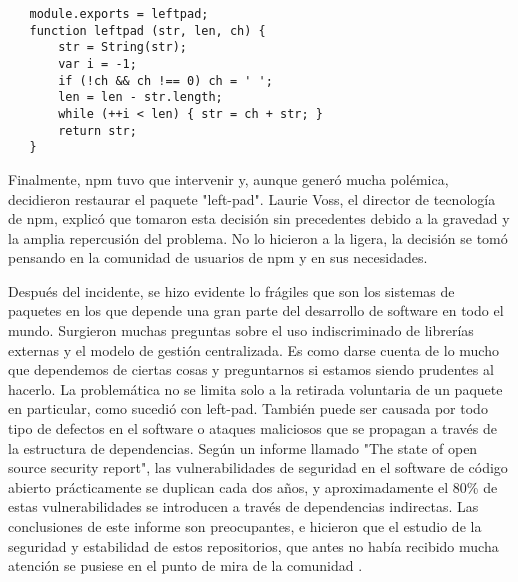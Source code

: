 \begin{verbatim}
   module.exports = leftpad;
   function leftpad (str, len, ch) {
       str = String(str);
       var i = -1;
       if (!ch && ch !== 0) ch = ' ';
       len = len - str.length;
       while (++i < len) { str = ch + str; }
       return str;
   }
\end{verbatim}


Finalmente, npm tuvo que intervenir y, aunque generó mucha polémica, decidieron restaurar el paquete "left-pad". Laurie Voss, el director de tecnología de npm, explicó que tomaron esta decisión sin precedentes debido a la gravedad y la amplia repercusión del problema. No lo hicieron a la ligera, la decisión se tomó pensando en la comunidad de usuarios de npm y en sus necesidades.


Después del incidente, se hizo evidente lo frágiles que son los sistemas de paquetes en los que depende una gran parte del desarrollo
de software en todo el mundo.
Surgieron muchas preguntas sobre el uso indiscriminado de librerías externas \cite{10.1145/3106237.3106267} y el modelo de gestión centralizada.
Es como darse cuenta de lo mucho que dependemos de ciertas cosas y preguntarnos si estamos siendo prudentes al hacerlo.
La problemática no se limita solo a la retirada voluntaria de un paquete en particular, como sucedió con left-pad.
También puede ser causada por todo tipo de defectos en el software o ataques maliciosos que se propagan a través de la estructura de dependencias.
Según un informe llamado "The state of open source security report", las vulnerabilidades de seguridad en el software de código abierto
prácticamente se duplican cada dos años, y aproximadamente el 80\% de estas vulnerabilidades se introducen a través de dependencias indirectas.
Las conclusiones de este informe son preocupantes, e hicieron que el estudio de la seguridad y estabilidad de estos repositorios, que antes no había
recibido mucha atención se pusiese en el punto de mira de la comunidad \cite{10.5555/2820518.2820524} \cite{10.1145/3196398.3196401} \cite{BogartChristopherKastner2015}.


